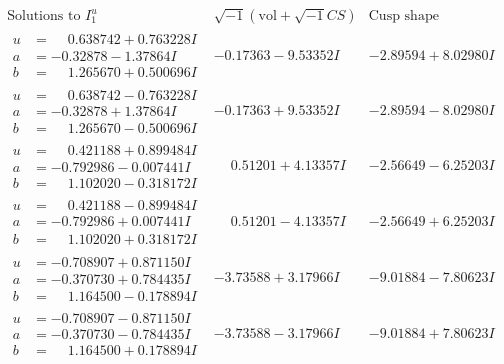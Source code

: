 \documentclass[1p]{elsarticle_modified}
\theoremstyle{definition}
\newcommand{\I}{\sqrt{-1}}
\begin{document}
$$\begin{array}{c|c|c}  
\text{Solutions to }I^u_{1}& \I (\text{vol} + \sqrt{-1}CS) & \text{Cusp shape}\\
 \hline 
\begin{aligned}
u &= \phantom{-}0.638742 + 0.763228 I \\
a &= -0.32878 - 1.37864 I \\
b &= \phantom{-}1.265670 + 0.500696 I\end{aligned}
 & -0.17363 - 9.53352 I & -2.89594 + 8.02980 I \\ \hline\begin{aligned}
u &= \phantom{-}0.638742 - 0.763228 I \\
a &= -0.32878 + 1.37864 I \\
b &= \phantom{-}1.265670 - 0.500696 I\end{aligned}
 & -0.17363 + 9.53352 I & -2.89594 - 8.02980 I \\ \hline\begin{aligned}
u &= \phantom{-}0.421188 + 0.899484 I \\
a &= -0.792986 - 0.007441 I \\
b &= \phantom{-}1.102020 - 0.318172 I\end{aligned}
 & \phantom{-}0.51201 + 4.13357 I & -2.56649 - 6.25203 I \\ \hline\begin{aligned}
u &= \phantom{-}0.421188 - 0.899484 I \\
a &= -0.792986 + 0.007441 I \\
b &= \phantom{-}1.102020 + 0.318172 I\end{aligned}
 & \phantom{-}0.51201 - 4.13357 I & -2.56649 + 6.25203 I \\ \hline\begin{aligned}
u &= -0.708907 + 0.871150 I \\
a &= -0.370730 + 0.784435 I \\
b &= \phantom{-}1.164500 - 0.178894 I\end{aligned}
 & -3.73588 + 3.17966 I & -9.01884 - 7.80623 I \\ \hline\begin{aligned}
u &= -0.708907 - 0.871150 I \\
a &= -0.370730 - 0.784435 I \\
b &= \phantom{-}1.164500 + 0.178894 I\end{aligned}
 & -3.73588 - 3.17966 I & -9.01884 + 7.80623 I \\ \hline\begin{aligned}

\end{aligned}
\end{array}$$
\end{document}
